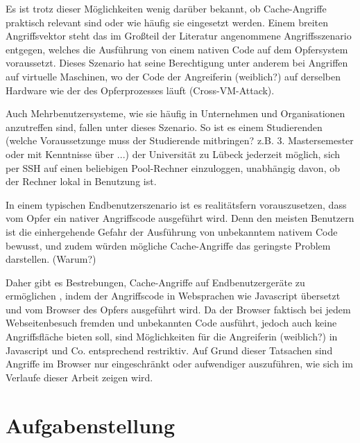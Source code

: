 Es ist trotz dieser Möglichkeiten wenig darüber bekannt, ob Cache-Angriffe praktisch relevant sind oder wie häufig sie eingesetzt werden.
Einem breiten Angriffsvektor steht das im Großteil der Literatur angenommene Angriffsszenario entgegen, welches die Ausführung von einem nativen Code auf dem Opfersystem voraussetzt.
Dieses Szenario hat seine Berechtigung unter anderem bei Angriffen auf virtuelle Maschinen, wo der Code der Angreiferin (weiblich?) auf derselben Hardware wie der des Opferprozesses läuft (Cross-VM-Attack).

Auch Mehrbenutzersysteme, wie sie häufig in Unternehmen und Organisationen anzutreffen sind, fallen unter dieses Szenario.
So ist es einem Studierenden (welche Voraussetzunge muss der Studierende mitbringen? z.B. 3. Mastersemester oder mit Kenntnisse über ...) der Universität zu Lübeck jederzeit möglich, sich per SSH auf einen beliebigen Pool-Rechner einzuloggen, unabhängig davon, ob der Rechner lokal in Benutzung ist.

In einem typischen Endbenutzerszenario ist es realitätsfern vorauszusetzen, dass vom Opfer ein nativer Angriffscode ausgeführt wird.
Denn den meisten Benutzern ist die einhergehende Gefahr der Ausführung von unbekanntem nativem Code bewusst, und zudem würden mögliche Cache-Angriffe das geringste Problem darstellen. (Warum?)

Daher gibt es Bestrebungen, Cache-Angriffe auf Endbenutzergeräte zu ermöglichen \cite{TheSpyInTheSandbox,DriveByPaper,ASLROnTheLine}, indem der Angriffscode in Websprachen wie Javascript übersetzt und vom Browser des Opfers ausgeführt wird.
Da der Browser faktisch bei jedem Webseitenbesuch fremden und unbekannten Code ausführt, jedoch auch keine Angriffsfläche bieten soll, sind Möglichkeiten für die Angreiferin (weiblich?) in Javascript und Co. entsprechend restriktiv.
Auf Grund dieser Tatsachen sind Angriffe im Browser nur eingeschränkt oder aufwendiger auszuführen, wie sich im Verlaufe dieser Arbeit zeigen wird. 

\section{Aufgabenstellung}


